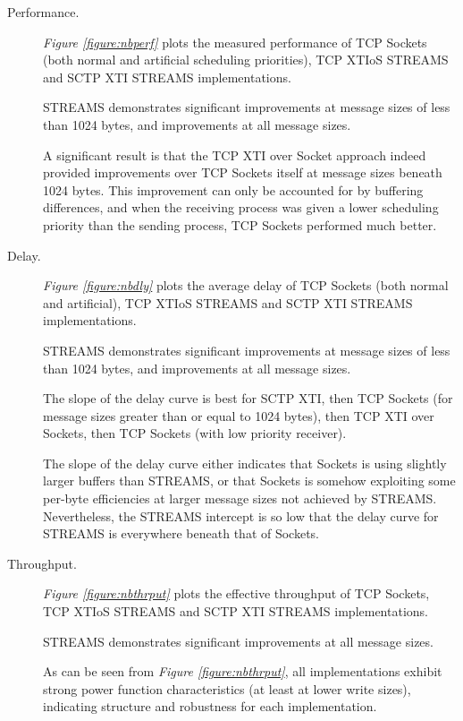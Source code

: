 \documentclass[letterpaper,final,notitlepage,twocolumn,10pt,twoside]{article}
\begin{document}
\begin{description}

\item[Performance.]

\textit{Figure \ref{figure:nbperf}}
plots the measured performance of TCP Sockets (both normal and artificial scheduling priorities),
TCP XTIoS STREAMS and SCTP XTI STREAMS implementations.

STREAMS demonstrates significant improvements at message sizes of less than 1024 bytes, and
improvements at all message sizes.

A significant result is that the TCP XTI over Socket approach indeed provided improvements over TCP
Sockets itself at message sizes beneath 1024 bytes.  This improvement can only be accounted for by
buffering differences, and when the receiving process was given a lower scheduling priority than the
sending process, TCP Sockets performed much better.

\item[Delay.]

\textit{Figure \ref{figure:nbdly}}
plots the average delay of TCP Sockets (both normal and artificial), TCP XTIoS STREAMS and SCTP XTI
STREAMS implementations.

STREAMS demonstrates significant improvements at message sizes of less than 1024 bytes, and
improvements at all message sizes.

The slope of the delay curve is best for SCTP XTI, then TCP Sockets (for message sizes greater than
or equal to 1024 bytes), then TCP XTI over Sockets, then TCP Sockets (with low priority receiver).

The slope of the delay curve either indicates that Sockets is using slightly larger buffers than
STREAMS, or that Sockets is somehow exploiting some per-byte efficiencies at larger message sizes
not achieved by STREAMS.  Nevertheless, the STREAMS intercept is so low that the delay curve for
STREAMS is everywhere beneath that of Sockets.

\item[Throughput.]

\textit{Figure \ref{figure:nbthrput}}
plots the effective throughput of TCP Sockets, TCP XTIoS STREAMS and SCTP XTI STREAMS
implementations.

STREAMS demonstrates significant improvements at all message sizes.

As can be seen from \textit{Figure \ref{figure:nbthrput}}, all implementations exhibit strong power
function characteristics (at least at lower write sizes), indicating structure and robustness for
each implementation.


\end{description}
\end{document}
